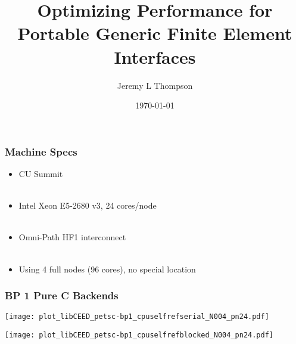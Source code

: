 \documentclass{beamer}
\title[libCEED Finite Element Library]{Optimizing Performance for Portable Generic Finite Element Interfaces} %
\author{Jeremy L Thompson} %
\institute[CU Boulder] %
{University of Colorado Boulder \\ %
\medskip
\textit{jeremy.thompson@colorado.edu} %
}
\date{\today} %
\begin{document}

\begin{frame}
\begin{center}
\frametitle{Machine Specs}

\begin{itemize}

\item CU Summit\\

~\\

\item Intel Xeon E5-2680 v3, 24 cores/node\\

~\\

\item Omni-Path HF1 interconnect\\

~\\

\item Using 4 full nodes (96 cores), no special location

\end{itemize}

\end{center}
\end{frame}


\begin{frame}
\begin{center}
\frametitle{BP 1 Pure C Backends}

\begin{multicols}{2}

\begin{flushleft}
\texttt{[image: plot\_libCEED\_petsc-bp1\_cpuselfrefserial\_N004\_pn24.pdf]}
\end{flushleft}

\begin{flushright}
\texttt{[image: plot\_libCEED\_petsc-bp1\_cpuselfrefblocked\_N004\_pn24.pdf]}
\end{flushright}

\end{multicols}

\end{center}
\end{frame}

\end{document}
